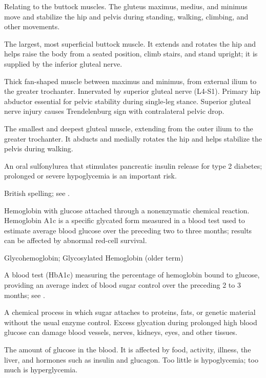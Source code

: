  Relating to the buttock muscles. The gluteus maximus, medius, and minimus move and stabilize the hip and pelvis during standing, walking, climbing, and other movements.

 The largest, most superficial buttock muscle. It extends and rotates the hip and helps raise the body from a seated position, climb stairs, and stand upright; it is supplied by the inferior gluteal nerve.

 Thick fan-shaped muscle between maximus and minimus, from external ilium to the greater
trochanter. Innervated by superior gluteal nerve (L4-S1). Primary hip abductor essential
for pelvic stability during single-leg stance. Superior gluteal nerve injury causes
Trendelenburg sign with contralateral pelvic drop.

 The smallest and deepest gluteal muscle, extending from the outer ilium to the greater trochanter. It abducts and
medially rotates the hip and helps stabilize the pelvis during walking.

 An oral sulfonylurea that stimulates pancreatic insulin release for type 2 diabetes; prolonged or severe hypoglycemia is an important risk.

 British spelling; see .

 Hemoglobin with glucose attached
through a nonenzymatic chemical reaction. Hemoglobin A1c is a specific glycated form
measured in a blood test used to estimate average blood glucose over the preceding two to three months;
results can be affected by abnormal red-cell survival.

\synonyms
Glycohemoglobin; Glycosylated Hemoglobin (older term)

 A blood test (HbA1c) measuring the percentage of hemoglobin bound to glucose, providing an average index of blood sugar control over the preceding 2 to 3 months; see .

 A chemical process in which sugar attaches to proteins, fats, or genetic material without the usual enzyme control. Excess glycation during prolonged high blood glucose can damage blood vessels, nerves, kidneys, eyes, and other tissues.

 The amount of glucose in the blood. It is affected by food, activity, illness, the liver, and hormones such as insulin and glucagon. Too little is hypoglycemia; too much is hyperglycemia.

